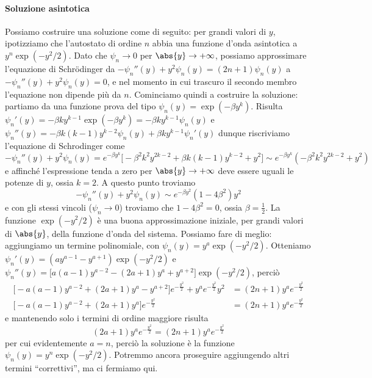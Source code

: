 \paragraph{Soluzione asintotica}
Possiamo costruire una soluzione come di seguito: per grandi valori di $y$, ipotizziamo che l'autostato di ordine $n$ abbia una funzione d'onda asintotica a $y^n\exp(-y^2/2)$.
Dato che $\psi_n\to 0$ per $\abs{y}\to+\infty$, possiamo approssimare l'equazione di Schr\"odinger da $-\psi_n''(y)+y^2\psi_n(y)=(2n+1)\psi_n(y)$ a $-\psi_n''(y)+y^2\psi_n(y)=0$, e nel momento in cui trascuro il secondo membro l'equazione non dipende più da $n$.
Cominciamo quindi a costruire la soluzione: partiamo da una funzione prova del tipo $\psi_n(y)=\exp(-\beta y^k)$.
Risulta $\psi_n'(y)=-\beta ky^{k-1}\exp(-\beta y^k)=-\beta ky^{k-1}\psi_n(y)$ e $\psi_n''(y)=-\beta k(k-1)y^{k-2}\psi_n(y)+\beta ky^{k-1}\psi_n'(y)$ dunque riscriviamo l'equazione di Schrodinger come
\begin{equation}
	-\psi_n''(y)+y^2\psi_n(y)=e^{-\beta y^k}\big[-\beta^2k^2y^{2k-2}+\beta k(k-1)y^{k-2}+y^2\big]\sim e^{-\beta y^k}(-\beta^2k^2y^{2k-2}+y^2)
\end{equation}
e affinch\'e l'espressione tenda a zero per $\abs{y}\to+\infty$ deve essere uguali le potenze di $y$, ossia $k=2$.
A questo punto troviamo
\begin{equation}
	-\psi_n''(y)+y^2\psi_n(y)\sim e^{-\beta y^2}(1-4\beta^2)y^2
\end{equation}
e con gli stessi vincoli ($\psi_n\to 0$) troviamo che $1-4\beta^2=0$, ossia $\beta=\frac12$.
La funzione $\exp(-y^2/2)$ è una buona approssimazione iniziale, per grandi valori di $\abs{y}$, della funzione d'onda del sistema.
Possiamo fare di meglio: aggiungiamo un termine polinomiale, con $\psi_n(y)=y^a\exp(-y^2/2)$.
Otteniamo $\psi_n'(y)=(ay^{a-1}-y^{a+1})\exp(-y^2/2)$ e $\psi_n''(y)=\big[a(a-1)y^{a-2}-(2a+1)y^a+y^{a+2}\big]\exp(-y^2/2)$, perciò
\begin{equation}
	\begin{aligned}
		\big[-a(a-1)y^{a-2}+(2a+1)y^a-y^{a+2}\big]e^{-\frac{y^2}2}+y^ae^{-\frac{y^2}2}y^2&=(2n+1)y^ae^{-\frac{y^2}2}\\
		\big[-a(a-1)y^{a-2}+(2a+1)y^a\big]e^{-\frac{y^2}2}&=(2n+1)y^ae^{-\frac{y^2}2}
	\end{aligned}
\end{equation}
e mantenendo solo i termini di ordine maggiore risulta
\begin{equation}
	(2a+1)y^ae^{-\frac{y^2}2}=(2n+1)y^ae^{-\frac{y^2}2}
\end{equation}
per cui evidentemente $a=n$, perciò la soluzione è la funzione $\psi_n(y)=y^n\exp(-y^2/2)$.
Potremmo ancora proseguire aggiungendo altri termini ``correttivi'', ma ci fermiamo qui.

